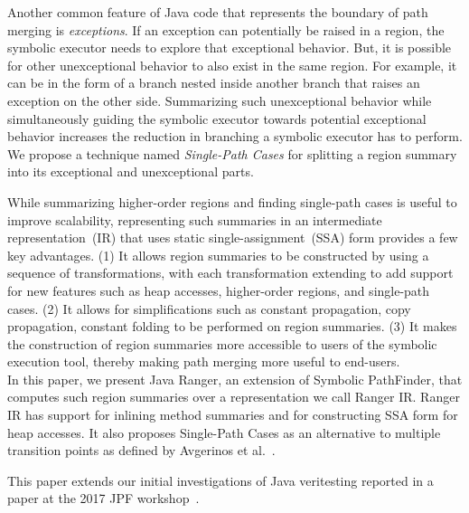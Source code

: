 Another common feature of Java code that represents the boundary of path merging is \textit{exceptions}.
%
If an exception can potentially be raised in a region, the symbolic executor needs to explore that exceptional behavior.
%
But, it is possible for other unexceptional behavior to also exist in the same region.
%
For example, it can be in the form of a branch nested inside another branch that raises an exception on the other side.
%
Summarizing such unexceptional behavior while simultaneously guiding the symbolic executor towards potential exceptional
behavior increases the reduction in branching a symbolic executor has to perform.
%
We propose a technique named \textit{Single-Path Cases} for splitting a region summary into its exceptional and
unexceptional parts.

While summarizing higher-order regions and finding single-path cases is useful to improve scalability,
representing such summaries in an intermediate representation~(IR) that uses static single-assignment~(SSA) form
provides a few key advantages.
%
(1) It allows region summaries to be constructed by using a sequence of transformations, with each transformation
extending to add support for new features such as heap accesses, higher-order regions, and single-path cases.
%
(2) It allows for simplifications such as constant propagation, copy propagation, constant folding to be performed on
region summaries.
%
(3) It makes the construction of region summaries more accessible to users of the symbolic execution tool, thereby making
path merging more useful to end-users.\\
%
In this paper, we present Java Ranger, an extension of Symbolic PathFinder, that computes such region summaries over a representation we call
Ranger IR.
%
Ranger IR has support for inlining method summaries and for constructing SSA form for heap accesses.
%
It also proposes Single-Path Cases as an alternative to multiple transition points as
defined by Avgerinos et al.~\cite{veritesting}.

This paper extends our initial investigations of Java veritesting
reported in a paper at the 2017 JPF
workshop~\cite{sharma-veritesting}.
%

